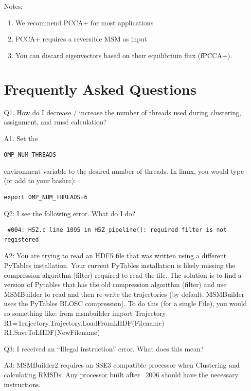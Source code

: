 \documentclass[12pt]{article}
\begin{document}
Notes:
\begin{enumerate}
 \item We recommend PCCA+ for most applications
 \item PCCA+ requires a reversible MSM as input
 \item You can discard eigenvectors based on their equilibrium flux (fPCCA+).
\end{enumerate}

\newpage

\section{Frequently Asked Questions}

Q1.  How do I decrease / increase the number of threads used during clustering, assignment, and rmsd calculation?

A1.  Set the \begin{verbatim}OMP_NUM_THREADS\end{verbatim} environment variable to the desired number of threads.  In linux, you would type (or add to your bashrc):
\begin{verbatim}
export OMP_NUM_THREADS=6 
\end{verbatim}

\vspace{5mm}

Q2:  I see the following error.  What do I do?
\begin{verbatim}
 #004: H5Z.c line 1095 in H5Z_pipeline(): required filter is not registered
\end{verbatim}

A2:  You are trying to read an HDF5 file that was written using a different PyTables installation.  Your current PyTables installation is likely missing the compression algorithm (filter) required to read the file.  The solution is to find a version of Pytables that has the old compression algorithm (filter) and use MSMBuilder to read and then re-write the trajectories (by default, MSMBuilder uses the PyTables BLOSC compression).  To do this (for a single File), you would so something like:
from msmbuilder import Trajectory
R1=Trajectory.Trajectory.LoadFromLHDF(Filename)
R1.SaveToLHDF(NewFilename)

\vspace{5mm}

Q3: I received an “Illegal instruction” error.  What does this mean?

A3:  MSMBuilder2 requires an SSE3 compatible processor when Clustering and calculating RMSDs.  Any processor built after ~2006 should have the necessary instructions.  
\end{document}
